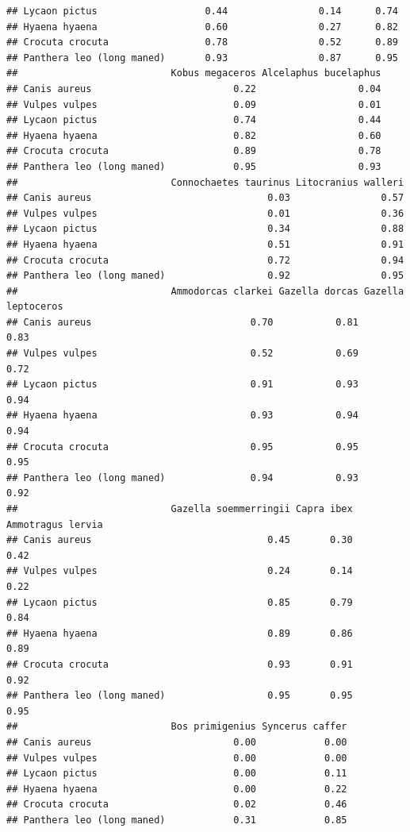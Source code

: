 \documentclass[
]{article}
\begin{document}
\begin{verbatim}
## Lycaon pictus                   0.44                0.14      0.74
## Hyaena hyaena                   0.60                0.27      0.82
## Crocuta crocuta                 0.78                0.52      0.89
## Panthera leo (long maned)       0.93                0.87      0.95
##                           Kobus megaceros Alcelaphus bucelaphus
## Canis aureus                         0.22                  0.04
## Vulpes vulpes                        0.09                  0.01
## Lycaon pictus                        0.74                  0.44
## Hyaena hyaena                        0.82                  0.60
## Crocuta crocuta                      0.89                  0.78
## Panthera leo (long maned)            0.95                  0.93
##                           Connochaetes taurinus Litocranius walleri
## Canis aureus                               0.03                0.57
## Vulpes vulpes                              0.01                0.36
## Lycaon pictus                              0.34                0.88
## Hyaena hyaena                              0.51                0.91
## Crocuta crocuta                            0.72                0.94
## Panthera leo (long maned)                  0.92                0.95
##                           Ammodorcas clarkei Gazella dorcas Gazella leptoceros
## Canis aureus                            0.70           0.81               0.83
## Vulpes vulpes                           0.52           0.69               0.72
## Lycaon pictus                           0.91           0.93               0.94
## Hyaena hyaena                           0.93           0.94               0.94
## Crocuta crocuta                         0.95           0.95               0.95
## Panthera leo (long maned)               0.94           0.93               0.92
##                           Gazella soemmerringii Capra ibex Ammotragus lervia
## Canis aureus                               0.45       0.30              0.42
## Vulpes vulpes                              0.24       0.14              0.22
## Lycaon pictus                              0.85       0.79              0.84
## Hyaena hyaena                              0.89       0.86              0.89
## Crocuta crocuta                            0.93       0.91              0.92
## Panthera leo (long maned)                  0.95       0.95              0.95
##                           Bos primigenius Syncerus caffer
## Canis aureus                         0.00            0.00
## Vulpes vulpes                        0.00            0.00
## Lycaon pictus                        0.00            0.11
## Hyaena hyaena                        0.00            0.22
## Crocuta crocuta                      0.02            0.46
## Panthera leo (long maned)            0.31            0.85
\end{verbatim}
\end{document}
